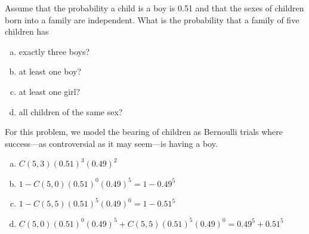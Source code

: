 \documentclass[../main.tex]{subfiles}
\begin{document}
Assume that the probability a child is a boy is 0.51 and that the sexes of children born into a family are independent.
What is the probability that a family of five children has
\begin{enumerate}[a)]
	\item exactly three boys?
	\item at least one boy?
	\item at least one girl?
	\item all children of the same sex?
\end{enumerate}

\solution
For this problem, we model the bearing of children as Bernoulli trials where success---as controversial as it may seem---is having a boy.
\begin{enumerate}[a)]
	\item $C(5, 3)(0.51)^3(0.49)^2$
	\item $1 - C(5, 0)(0.51)^0(0.49)^5 = 1 - 0.49^5$
	\item $1 - C(5, 5)(0.51)^5(0.49)^0 = 1 - 0.51^5$
	\item $C(5, 0)(0.51)^0(0.49)^5 + C(5, 5)(0.51)^5(0.49)^0 = 0.49^5 + 0.51^5$
\end{enumerate}
\end{document}
